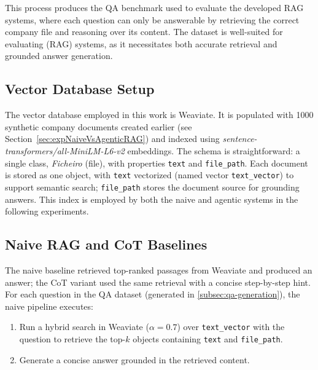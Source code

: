 This process produces the \gls{QA} benchmark used to evaluate the developed \gls{RAG} systems, where each question can only be answerable by retrieving the correct company file and reasoning over its content. The dataset is well-suited for evaluating (\gls{RAG}) systems, as it necessitates both accurate retrieval and grounded answer generation.

\subsection{Vector Database Setup}
The vector database employed in this work is Weaviate. It is populated with 1000 synthetic company documents created earlier (see Section~\ref{sec:expNaiveVsAgenticRAG}) and indexed using \textit{sentence-transformers/all-MiniLM-L6-v2} embeddings. The schema is straightforward: a single class, \textit{Ficheiro} (file), with properties \texttt{text} and \texttt{file\_path}. Each document is stored as one object, with \texttt{text} vectorized (named vector \texttt{text\_vector}) to support semantic search; \texttt{file\_path} stores the document source for grounding answers. This index is employed by both the naive and agentic systems in the following experiments.

\subsection{Naive RAG and CoT Baselines}
\label{sec:naive-rag-and-cot-baseline}
The naive baseline retrieved top-ranked passages from Weaviate and produced an answer; the CoT variant used the same retrieval with a concise step-by-step hint.
For each question in the \gls{QA} dataset (generated in \ref{subsec:qa-generation}), the naive pipeline executes:
\begin{enumerate}
    \item Run a hybrid search in Weaviate (\(\alpha = 0.7\)) over \texttt{text\_vector} with the question to retrieve the top-$k$ objects containing \texttt{text} and \texttt{file\_path}.
    \item Generate a concise answer grounded in the retrieved content.
\end{enumerate}

